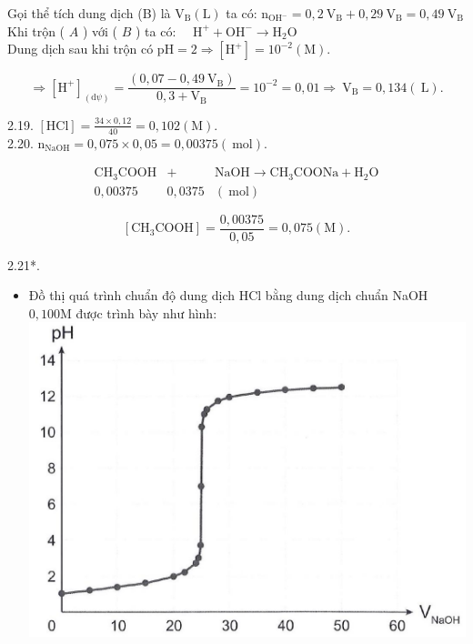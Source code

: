 \documentclass[10pt]{article}
\begin{document}
Gọi thể tích dung dịch (B) là $\mathrm{V}_{\mathrm{B}}(\mathrm{L})$ ta có: $\mathrm{n}_{\mathrm{OH}^{-}}=0,2 \mathrm{~V}_{\mathrm{B}}+0,29 \mathrm{~V}_{\mathrm{B}}=0,49 \mathrm{~V}_{\mathrm{B}}$ Khi trộn ( $A$ ) với ( $B$ ) ta có: $\quad \mathrm{H}^{+}+\mathrm{OH}^{-} \rightarrow \mathrm{H}_{2} \mathrm{O}$\\
Dung dịch sau khi trộn có $\mathrm{pH}=2 \Rightarrow\left[\mathrm{H}^{+}\right]=10^{-2}(\mathrm{M})$.

$$
\Rightarrow\left[\mathrm{H}^{+}\right]_{(\mathrm{d} \psi)}=\frac{\left(0,07-0,49 \mathrm{~V}_{\mathrm{B}}\right)}{0,3+\mathrm{V}_{\mathrm{B}}}=10^{-2}=0,01 \Rightarrow \mathrm{~V}_{\mathrm{B}}=0,134(\mathrm{~L}) .
$$

2.19. $[\mathrm{HCl}]=\frac{34 \times 0,12}{40}=0,102(\mathrm{M})$.\\
2.20. $\mathrm{n}_{\mathrm{NaOH}}=0,075 \times 0,05=0,00375(\mathrm{~mol})$.

$$
\begin{array}{lll}
\mathrm{CH}_{3} \mathrm{COOH} & + & \mathrm{NaOH} \rightarrow \mathrm{CH}_{3} \mathrm{COONa}+\mathrm{H}_{2} \mathrm{O} \\
0,00375 & 0,0375 & (\mathrm{~mol})
\end{array}
$$

$$
\left[\mathrm{CH}_{3} \mathrm{COOH}\right]=\frac{0,00375}{0,05}=0,075(\mathrm{M}) .
$$

2.21*.

\begin{itemize}
  \item Đồ thị quá trình chuẩn độ dung dịch HCl bằng dung dịch chuẩn NaOH $0,100 \mathrm{M}$ được trình bày như hình:\\
\includegraphics[max width=\textwidth, center]{2025_10_23_adad5b98d65ac6665838g-04}
\end{itemize}
\end{document}
